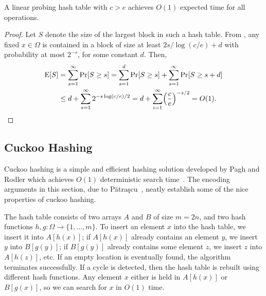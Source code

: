 \begin{thm}
  A linear probing hash table with $c > e$ achieves $O(1)$ expected
  time for all operations.
\end{thm}
\begin{proof}
  Let $S$ denote the size of the largest block in such a hash
  table. From , any fixed $x \in \Omega$
  is contained in a block of size at least $2s/\log (c/e) + d$ with
  probability at most $2^{-s}$, for some constant $d$. Then,
  \begin{align*}
    \E[S] &= \sum_{s = 1}^\infty \Pr[S \geq s] = \sum_{s = 1}^{d} \Pr[S \geq s] + \sum_{s = 1}^\infty \Pr[S \geq s + d] \\
          &\leq d + \sum_{s = 1}^\infty 2^{-s \log (c/e)/2} = d + \sum_{i = 1}^\infty \left(\frac{c}{e}\right)^{-s/2} = O(1). \qedhere
  \end{align*}
\end{proof}

%
%

\subsection{Cuckoo Hashing}

Cuckoo hashing is a simple and efficient hashing solution developed by
Pagh and Rodler which achieves $O(1)$ deterministic search
time~\cite{pagh.rodler:cuckoo}. The encoding arguments in this
section, due to P\u{a}tra\c{s}cu~\cite{patrascu:cuckoo}, neatly
establish some of the nice properties of cuckoo hashing.

The hash table consists of two arrays $A$ and $B$ of size $m = 2n$,
and two hash functions $h, g : \Omega \to \{1, \ldots, m\}$. To insert
an element $x$ into the hash table, we insert it into $A[h(x)]$; if
$A[h(x)]$ already contains an element $y$, we insert $y$ into
$B[g(y)]$; if $B[g(y)]$ already contains some element $z$, we insert
$z$ into $A[h(z)]$, etc. If an empty location is eventually found, the
algorithm terminates successfully. If a cycle is detected, then the
hash table is rebuilt using different hash functions. Any element $x$
either is held in $A[h(x)]$ or $B[g(x)]$, so we can search for $x$ in
$O(1)$ time.

